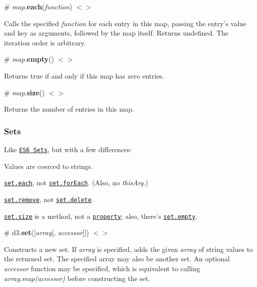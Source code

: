 \label{_map_each}%
\# {\itshape map}.{\bfseries each}({\itshape function}) \href{https://github.com/d3/d3-collection/blob/master/src/map.js#L48}{\tt $<$$>$}

Calls the specified {\itshape function} for each entry in this map, passing the entry’s value and key as arguments, followed by the map itself. Returns undefined. The iteration order is arbitrary.

\label{_map_empty}%
\# {\itshape map}.{\bfseries empty}() \href{https://github.com/d3/d3-collection/blob/master/src/map.js#L44}{\tt $<$$>$}

Returns true if and only if this map has zero entries.

\label{_map_size}%
\# {\itshape map}.{\bfseries size}() \href{https://github.com/d3/d3-collection/blob/master/src/map.js#L39}{\tt $<$$>$}

Returns the number of entries in this map.

\subsubsection*{Sets}

Like \href{https://developer.mozilla.org/en-US/docs/Web/JavaScript/Reference/Global_Objects/Set}{\tt E\+S6 Sets}, but with a few differences\+:


\begin{DoxyItemize}
\item Values are coerced to strings.
\item \href{#set_each}{\tt set.\+each}, not \href{https://developer.mozilla.org/en-US/docs/Web/JavaScript/Reference/Global_Objects/Set/forEach}{\tt set.\+for\+Each}. (Also, no {\itshape this\+Arg}.)
\item \href{#set_remove}{\tt set.\+remove}, not \href{https://developer.mozilla.org/en-US/docs/Web/JavaScript/Reference/Global_Objects/Set/delete}{\tt set.\+delete}.
\item \href{#set_size}{\tt set.\+size} is a method, not a \href{https://developer.mozilla.org/en-US/docs/Web/JavaScript/Reference/Global_Objects/Set/size}{\tt property}; also, there’s \href{#set_empty}{\tt set.\+empty}.
\end{DoxyItemize}

\label{_set}%
\# d3.{\bfseries set}(\mbox{[}{\itshape array}\mbox{[}, {\itshape accessor}\mbox{]}\mbox{]}) \href{https://github.com/d3/d3-collection/blob/master/src/set.js}{\tt $<$$>$}

Constructs a new set. If {\itshape array} is specified, adds the given {\itshape array} of string values to the returned set. The specified array may also be another set. An optional {\itshape accessor} function may be specified, which is equivalent to calling {\itshape array.\+map(accessor)} before constructing the set.

